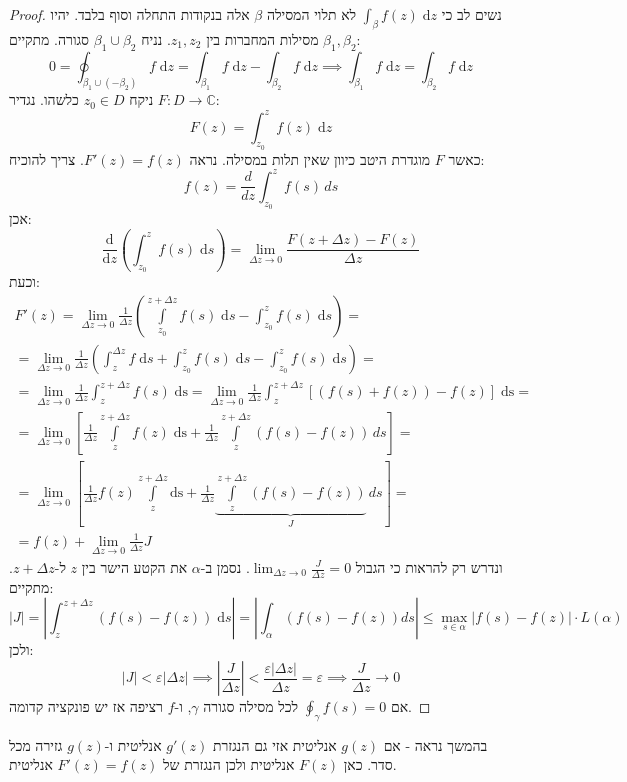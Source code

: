 \documentclass{tstextbook}
\begin{document}
\begin{proof}
נשים לב כי \(\int_{\beta}f(z)\;\mathrm{d}z\) לא תלוי המסילה \(\beta\) אלה בנקודות התחלה וסוף בלבד. יהיו \(\beta_{1},\beta_{2}\) מסילות המחברות בין \(z_{1},z_{2}\). נניח \(\beta_{1}\cup \beta_{2}\) סגורה. מתקיים:
$$0=\oint_{\beta_{1} \cup \left( -\beta_{2} \right)} f\;\mathrm{d}z=\int_{\beta_{1}}f\;\mathrm{d}z-\int_{\beta_{2}}f\;\mathrm{d}z\implies \int_{\beta_{1}}f\;\mathrm{d}z=\int_{\beta_{2}}f\;\mathrm{d}z$$
ניקח \(z_{0} \in D\) כלשהו. נגדיר \(F:D\to \mathbb{C}\):
$$F(z)=\int_{z_{0}}^z f(z)\;\mathrm{d}z$$
כאשר \(F\) מוגדרת היטב כיוון שאין תלות במסילה. נראה \(F'(z)=f(z)\). צריך להוכיח:
$$f(z)=\frac{d}{dz}\int_{z_{0}}^{z} f(s) \, ds $$
אכן:
$$\frac{\mathrm{d} }{\mathrm{d} z} \left( \int_{z_{0}}^z f(s)\;\mathrm{d}s \right)=\lim_{ \Delta z \to 0 }  \frac{F\left( z+\Delta z \right)-F(z)}{\Delta z}$$
וכעת:
$$\begin{gather}F'(z)=\lim_{ \Delta z \to 0 } \frac{1}{\Delta z}\left( \int\limits_{z_{0}}^{z+\Delta z} f(s)\;\mathrm{d}s -\int_{z_{0}}^{z} f(s)\;\mathrm{d}s    \right)= \\=\lim_{ \Delta z \to 0 } \frac{1}{\Delta z}\left( \int_{z}^{\Delta z}  \!\!\!f\; \mathrm{d}s+ \int_{z_{0}}^{z} f(s)\;\mathrm{d}s -\int_{z_{0}}^{z} f(s)\;\mathrm{d}s    \right) = \\= \lim_{ \Delta z \to 0 } \frac{1}{\Delta z} \int_{z}^{z+\Delta z} f(s)\;\mathrm{ds}= \lim_{ \Delta z \to 0 } \frac{1}{\Delta z} \int_{z}^{z+\Delta z} [(f(s)+f(z))-f(z)]\;\mathrm{ds}= \\= \lim_{ \Delta z \to 0 } \left[ \frac{1}{\Delta z} \int\limits_{z}^{z+\Delta z} f(z)\;\mathrm{ds}+\frac{1}{\Delta z}\int\limits_{z}^{z+\Delta z} (f(s)-f(z))  \, ds \right] = \\= \lim_{ \Delta z \to 0 } \left[ \frac{1}{\Delta z} f(z)\int\limits_{z}^{z+\Delta z} \mathrm{ds}+\frac{1}{\Delta z}\underbrace{ \int\limits_{z}^{z+\Delta z} (f(s)-f(z))  }_{ J } \, ds \right] =    \\=f(z)+\lim_{ \Delta z \to 0 } \frac{1}{\Delta z}J
\end{gather}$$
ונדרש רק להראות כי הגבול \(\lim_{ \Delta z \to 0 } \frac{J}{\Delta z}=0\). נסמן ב-\(\alpha\) את הקטע הישר בין \(z\) ל-\(z+\Delta z\). מתקיים:
$$\lvert J \rvert =\left\lvert  \int_{z}^{z+\Delta z}(f(s)-f(z))  \;\mathrm{d}s\right\rvert =\left\lvert  \int_{\alpha} (f(s)-f(z))ds \right\rvert \leq \max _{s \in \alpha}\lvert f(s)-f(z) \rvert \cdot L\left( \alpha \right)$$
ולכן:
$$\lvert J \rvert <\varepsilon \left\lvert  \Delta z  \right\rvert \implies \left\lvert  \frac{J}{\Delta z}  \right\rvert < \frac{\varepsilon \left\lvert  \Delta z  \right\rvert}{\Delta z}=\varepsilon\implies \frac{J}{\Delta z}\to 0$$
אם \(\oint_{\gamma}f(s)=0\) לכל מסילה סגורה \(\gamma\), ו-\(f\) רציפה אז יש פונקציה קדומה.

\end{proof}
\begin{remark}
בהמשך נראה - אם \(g(z)\) אנליטית אזי גם הנגזרת \(g'(z)\) אנליטית ו-\(g(z)\) גזירה מכל סדר. כאן \(F(z)\) אנליטית ולכן הנגזרת של \(F'(z)=f(z)\) אנליטית.

\end{remark}
\end{document}
